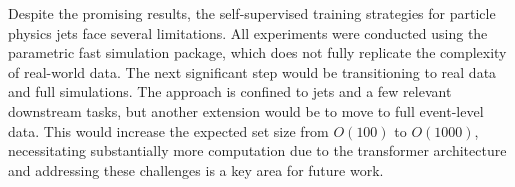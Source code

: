 Despite the promising results, the self-supervised training strategies for particle physics jets face several limitations.
All experiments were conducted using the parametric \delphes fast simulation package, which does not fully replicate the complexity of real-world data.
The next significant step would be transitioning to real data and full simulations.
The approach is confined to jets and a few relevant downstream tasks, but another extension would be to move to full event-level data.
This would increase the expected set size from $O(100)$ to $O(1000)$, necessitating substantially more computation due to the transformer architecture and addressing these challenges is a key area for future work.
